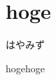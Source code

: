 

\cleardoublepage
\plainifnotempty


\chapter{hoge}


\begin{flushright}
はやみず
\end{flushright}


hogehoge